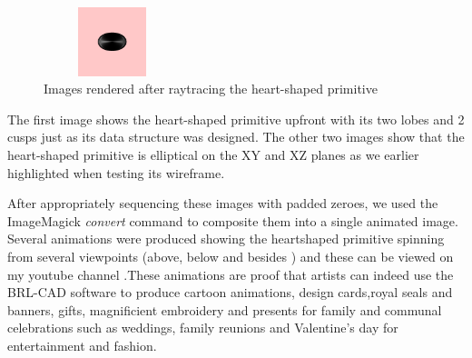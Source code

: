 \begin{figure}[htbp]
\begin{minipage}{0.2\textheight}
\begin{flushleft}
\end{flushleft}
\end{minipage}
\begin{minipage}{0.2\textheight}
\begin{flushleft}
\includegraphics[width=4cm,height=2cm, clip=true, totalheight=0.17\textheight]{Pictures/Below.png}
\end{flushleft}
\end{minipage}
\caption[Images rendered after ray­tracing the heart­-shaped primitive]{Images rendered after ray­tracing the heart-­shaped primitive}
\label{Besides}
\end{figure}

The   first   image   shows   the   heart-­shaped   primitive   upfront   with   its   two   lobes   and  
2   cusps   just   as   its   data   structure   was   designed.   The   other   two   images   show  
that   the   heart­-shaped   primitive   is   elliptical   on   the   XY   and   XZ   planes   as   we  
earlier highlighted when testing its wireframe.

\hspace{30} After   appropriately   sequencing   these   images   with   padded   zeroes,   we  
used   the   ImageMagick   \textit{convert}   command   to   composite   them   into   a   single  
animated   image.   Several   animations   were   produced   showing   the   heart­shaped  
primitive   spinning   from   several   viewpoints   (above, below and besides )   and  
these   can   be   viewed   on   my   youtube   channel \cite{43} \cite{44} .These   animations   are   proof   that  
artists   can   indeed   use   the   BRL-­CAD   software   to   produce   cartoon   animations,  
design   cards,royal   seals   and   banners,   gifts,   magnificient   embroidery   and  
presents   for   family   and   communal   celebrations   such   as   weddings,   family  
reunions and Valentine's day for entertainment and fashion.
\clearpage
